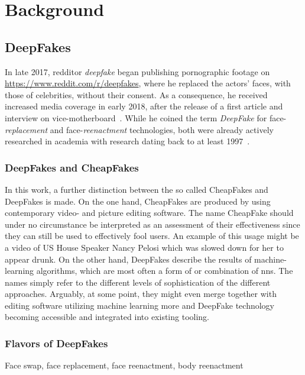 \section{Background}\label{sect:background}
\subsection{DeepFakes}\label{subsect:deepfakes}
In late 2017, \gls{redditor} \textit{deepfake} began publishing pornographic footage
on \url{https://www.reddit.com/r/deepfakes}, where he replaced the actors' faces,
with those of celebrities, without their consent. As a consequence, he
received increased media coverage in early 2018, after the release of a first 
article and interview on vice-motherboard~\cite{Cole.2017}. While he coined the
term \textit{DeepFake} for face-\textit{replacement} and face-\textit{reenactment}
technologies, both were already actively researched in academia with research 
dating back to at least 1997~\cite{Bregler.1997}.

\subsubsection{DeepFakes and CheapFakes}
In this work, a further distinction between the so called CheapFakes and DeepFakes
is made. On the one hand, CheapFakes are produced by using contemporary video- 
and picture editing software. The name CheapFake should under no circumstance be
interpreted as an assessment of their effectiveness since they can still be used
to effectively fool users. An example of this usage might be a video of US House
Speaker Nancy Pelosi which was slowed down for her to appear drunk.
On the other hand, DeepFakes describe the results of machine-learning algorithms,
which are most often a form of or combination of \glspl{nn}.
The names simply refer to the different levels of sophistication of the different
approaches. Arguably, at some point, they might even merge together with editing 
software utilizing machine learning more and DeepFake technology becoming accessible 
and integrated into existing tooling.

\subsubsection{Flavors of DeepFakes}\label{subsubsect:deepfake-flavors}
Face swap, face replacement, face reenactment, body reenactment


